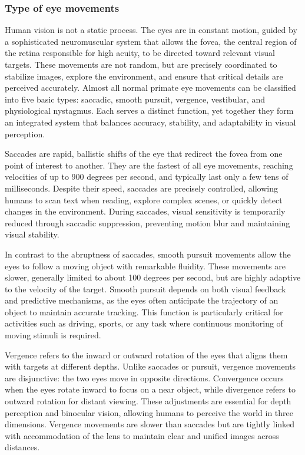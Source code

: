 \documentclass{article}
\begin{document}
\subsubsection{Type of eye movements}

Human vision is not a static process. 
The eyes are in constant motion, guided by a sophisticated neuromuscular system that allows the fovea, the central region of the retina responsible for high acuity, to be directed toward relevant visual targets.
These movements are not random, but are precisely coordinated to stabilize images, explore the environment, and ensure that critical details are perceived accurately.
Almost all normal primate eye movements can be classified into five basic types: saccadic, smooth pursuit, vergence, vestibular, and physiological nystagmus.
Each serves a distinct function, yet together they form an integrated system that balances accuracy, stability, and adaptability in visual perception.

Saccades are rapid, ballistic shifts of the eye that redirect the fovea from one point of interest to another.
They are the fastest of all eye movements, reaching velocities of up to 900 degrees per second, and typically last only a few tens of milliseconds. 
Despite their speed, saccades are precisely controlled, allowing humans to scan text when reading, explore complex scenes, or quickly detect changes in the environment. 
During saccades, visual sensitivity is temporarily reduced through saccadic suppression, preventing motion blur and maintaining visual stability.

In contrast to the abruptness of saccades, smooth pursuit movements allow the eyes to follow a moving object with remarkable fluidity. 
These movements are slower, generally limited to about 100 degrees per second, but are highly adaptive to the velocity of the target.
Smooth pursuit depends on both visual feedback and predictive mechanisms, as the eyes often anticipate the trajectory of an object to maintain accurate tracking.
This function is particularly critical for activities such as driving, sports, or any task where continuous monitoring of moving stimuli is required.

Vergence refers to the inward or outward rotation of the eyes that aligns them with targets at different depths.
Unlike saccades or pursuit, vergence movements are disjunctive: the two eyes move in opposite directions.
Convergence occurs when the eyes rotate inward to focus on a near object, while divergence refers to outward rotation for distant viewing. 
These adjustments are essential for depth perception and binocular vision, allowing humans to perceive the world in three dimensions.
Vergence movements are slower than saccades but are tightly linked with accommodation of the lens to maintain clear and unified images across distances.
\end{document}
